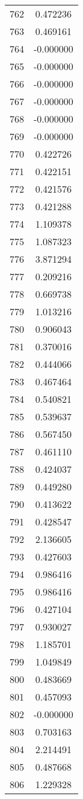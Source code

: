\documentclass[12pt]{article}
\begin{document}
\begin{longtable}{@{}cc@{}}
762 & 0.472236 \\
763 & 0.469161 \\
764 & -0.000000 \\
765 & -0.000000 \\
766 & -0.000000 \\
767 & -0.000000 \\
768 & -0.000000 \\
769 & -0.000000 \\
770 & 0.422726 \\
771 & 0.422151 \\
772 & 0.421576 \\
773 & 0.421288 \\
774 & 1.109378 \\
775 & 1.087323 \\
776 & 3.871294 \\
777 & 0.209216 \\
778 & 0.669738 \\
779 & 1.013216 \\
780 & 0.906043 \\
781 & 0.370016 \\
782 & 0.444066 \\
783 & 0.467464 \\
784 & 0.540821 \\
785 & 0.539637 \\
786 & 0.567450 \\
787 & 0.461110 \\
788 & 0.424037 \\
789 & 0.449280 \\
790 & 0.413622 \\
791 & 0.428547 \\
792 & 2.136605 \\
793 & 0.427603 \\
794 & 0.986416 \\
795 & 0.986416 \\
796 & 0.427104 \\
797 & 0.930027 \\
798 & 1.185701 \\
799 & 1.049849 \\
800 & 0.483669 \\
801 & 0.457093 \\
802 & -0.000000 \\
803 & 0.703163 \\
804 & 2.214491 \\
805 & 0.487668 \\
806 & 1.229328 \\

\end{longtable}
\end{document}
